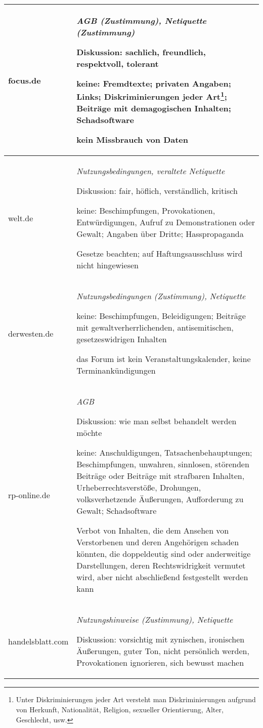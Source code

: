 \begin{landscape}
\begin{longtable}{lp{170mm}}
focus.de & \emph{AGB (Zustimmung), Netiquette (Zustimmung)}
	
	Diskussion: sachlich, freundlich, respektvoll, tolerant
	
	keine: Fremdtexte; privaten Angaben; Links; Diskriminierungen jeder Art\footnote{Unter Diskriminierungen jeder Art versteht man Diskriminierungen  
	aufgrund von Herkunft, Nationalität, Religion, sexueller Orientierung, Alter,
	Geschlecht, usw.}; Beiträge mit  demagogischen Inhalten; Schadsoftware
	
	kein Missbrauch von Daten
	\tabularnewline\midrule

welt.de & \emph{Nutzungsbedingungen, veraltete Netiquette}

	Diskussion: fair, höflich, verständlich, kritisch
		
	keine: Be\-schim\-pfung\-en, Pro\-vo\-ka\-tio\-nen, Ent\-wür\-di\-gung\-en, Auf\-ruf zu Demonstrationen oder Gewalt; Angaben über Dritte; 					Hasspropaganda 
	
	Gesetze beachten; auf Haftungsausschluss wird nicht hingewiesen\tabularnewline\midrule

derwesten.de & \emph{Nutzungsbedingungen (Zustimmung), Netiquette}

	keine: Beschimpfungen, Beleidigungen; Beiträge mit gewaltverherrlichenden, antisemitischen, gesetzeswidrigen Inhalten

	das Forum ist kein Ver\-an\-stal\-tungs\-ka\-len\-der, keine Ter\-min\-an\-kün\-di\-gun\-gen
	\tabularnewline\midrule


rp-online.de & \emph{AGB}

	Diskussion: wie man selbst behandelt werden möchte
	
	keine: Anschuldigungen, Tatsachenbehauptungen; Beschimpfungen, unwahren, sinnlosen, störenden Beiträge oder Beiträge mit strafbaren Inhalten, Urheberrechtsverstöße, Drohungen, volksverhetzende Äußerungen, Aufforderung zu Gewalt; Schadsoftware
	
	Verbot von Inhalten, die dem Ansehen von Verstorbenen und deren Angehörigen schaden könnten, die doppeldeutig
	sind oder anderweitige Darstellungen, deren Rechtswidrigkeit vermutet
	wird, aber nicht abschließend festgestellt werden kann
	\tabularnewline\midrule

handelsblatt.com & \emph{Nutzungshinweise (Zustimmung), Netiquette}

	Diskussion: vorsichtig mit zynischen, ironischen Äußerungen, guter Ton, nicht
	persönlich werden, Provokationen ignorieren, sich bewusst machen
	 

\end{longtable}
\end{landscape}
